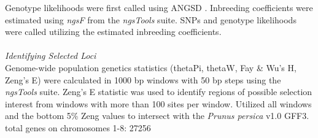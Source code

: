 \documentclass[12pt]{article}
\begin{document}
%
%
Genotype likelihoods were first called using ANGSD \citep{korneliussen2014angsd}.
%
Inbreeding coefficients were estimated using \emph{ngsF} from the \emph{ngsTools} \citep{fumagalli2014ngstools} suite.
%
SNPs and genotype likelihoods were called utilizing the estimated inbreeding coefficients.\\
\\
\emph{Identifying Selected Loci}\\
Genome-wide population genetics statistics (thetaPi, thetaW, Fay \& Wu's H, Zeng's E) were calculated in 1000 bp windows with 50 bp steps using the \emph{ngsTools} \citep{fumagalli2014ngstools} suite.
%
Zeng's E statistic \citep{zeng2006statistical} was used to identify regions of possible selection interest from windows with more than 100 sites per window.
%
Utilized all windows and the bottom 5\% Zeng values to intersect with the \emph{Prunus persica} v1.0 GFF3.\\
%

total genes on chromosomes 1-8: 27256
\end{document}
